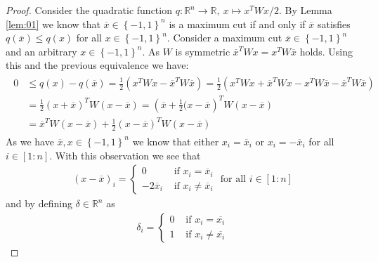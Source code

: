 \documentclass[12pt,a4paper]{article}
\theoremstyle{mythm}
\begin{document}
\begin{proof}
Consider the quadratic function $ q : \mathbb{R} ^{ n }  \to \mathbb{R}  , \ x \mapsto x^T W x /2 $.
By Lemma \ref{lem:01} we know that $ \overline{ x } \in \left\{ -1,1 \right\} ^{ n }  $ is a maximum cut if and only if $ \overline{ x }  $ satisfies  $ q \left( \overline{ x }  \right) \leq q \left( x \right)   $
for all $ x \in \left\{ -1,1 \right\} ^{ n }  $.
Consider a maximum cut $ \overline{ x } \in \left\{ -1,1 \right\} ^{ n }  $ and an arbitrary $ x \in \left\{ -1,1 \right\} ^{ n }  $.
As $ W $ is symmetric $ \overline{ x } ^{ T } W x = x^T W \overline{ x } $ holds.
Using this and the previous equivalence we have:
\begin{align}
\label{eq:nonnegsum1} 
\begin{split}
0 &\leq 
q \left( x   \right) - q \left( \overline{ x }  \right) = \frac{ 1 }{ 2 } \left( x^TWx - \overline{ x } ^{ T } W \overline{ x }  \right) = 
 \frac{ 1 }{ 2 } \left( x^TWx + \overline{ x } ^T Wx - x^TW \overline{ x } -  \overline{ x } ^{ T } W \overline{ x }  \right) \\
&= \frac{ 1 }{ 2 } \left( x + \overline{ x }  \right) ^T W \left( x - \overline{ x }  \right)
= \left( \overline{ x } + \frac{ 1 }{ 2 } ( x - \overline{ x }   \right) ^T W \left( x - \overline{ x }  \right) \\
&= \overline{ x } ^T W \left( x- \overline{ x }  \right) + \frac{ 1 }{ 2 } \left( x - \overline{ x }  \right) ^T W \left( x - \overline{ x }  \right) 
\end{split}
\end{align} 
As we have $ \overline{ x } , x \in \left\{ -1,1 \right\} ^{ n }  $ we know that either $ x_i = \overline{ x } _{ i }  $ or $ x_i = - \overline{ x } _{ i }  $ for all $ i \in
\left[ 1:n \right]  $. With this observation we see that 
\begin{align*}
\left( x - \overline{ x }  \right) _{ i } = \begin{cases}
0 & \text{ if }   x_i = \overline{ x } _{ i }   \\
- 2 \overline{ x } _i & \text{ if }   x_i \neq \overline{ x } _{ i }   
\end{cases}
\text{ for all } i \in \left[ 1:n \right] 
\end{align*} 
and by defining $ \delta \in \mathbb{R} ^{ n }  $ as
\begin{align*}
\delta_i = \begin{cases}
0 & \text{ if } x_i = \overline{ x_i } \\
1 & \text{ if } x_i \neq \overline{ x_i }  

\end{cases}
\end{align*}
\end{proof}
\end{document}
